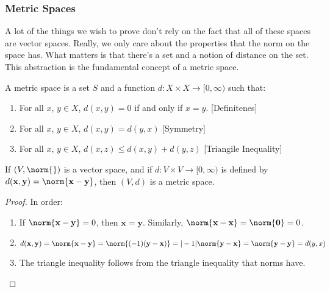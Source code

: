 \documentclass[crop=false,class=article,oneside]{standalone}
\begin{document}
        \subsubsection{Metric Spaces}
            A lot of the things we wish to
            prove don't rely on the fact that all of these
            spaces are vector spaces. Really, we only care about
            the properties that the norm on the space has.
            What matters is that there's a set and a notion
            of distance on the set. This abstraction is the
            fundamental concept of a metric space.
            \begin{definition}
                A metric space is a set $S$ and a function
                $d:{X}\times{X}\rightarrow[0,\infty)$ such that:
                \begin{enumerate}
                    \item For all $x$, $y\in{X}$, $d(x,y)=0$
                          if and only if $x=y$.
                          \hfill[Definitenes]
                    \item For all $x$, $y\in{X}$,
                          $d(x,y)=d(y,x)$
                          \hfill[Symmetry]
                    \item For all $x$, $y\in{X}$,
                          $d(x,z)\leq{d(x,y)+d(y,z)}$
                          \hfill[Triangile Inequality]
                \end{enumerate}
            \end{definition}
            \begin{theorem}
                If $(V,\norm{})$ is a vector space,
                and if $d:{V}\times{V}\rightarrow[0,\infty)$
                is defined by
                $d(\mathbf{x},\mathbf{y})%
                 =\norm{\mathbf{x}-\mathbf{y}}$,
                then $(V,d)$ is a metric space.
            \end{theorem}
            \begin{proof}
                In order:
                \begin{enumerate}
                    \item If $\norm{\mathbf{x}-\mathbf{y}}=0$,
                          then $\mathbf{x}=\mathbf{y}$.
                          Similarly,
                          $\norm{\mathbf{x}-\mathbf{x}}%
                           =\norm{\mathbf{0}}=0$.
                    \item $d(\mathbf{x},\mathbf{y})%
                           =\norm{\mathbf{x}-\mathbf{y}}%
                           =\norm{(-1)(\mathbf{y}-\mathbf{x})}%
                           =|-1|\norm{\mathbf{y}-\mathbf{x}}%
                           =\norm{\mathbf{y}-\mathbf{y}}%
                           =d(y,x)$
                    \item The triangle inequality follows
                          from the triangle inequality that
                          norms have.
                \end{enumerate}
            \end{proof}
\end{document}
